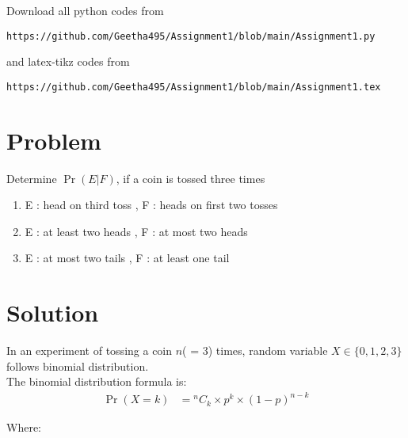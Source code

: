 \documentclass[journal,12pt,twocolumn]{IEEEtran}
\newcommand*{\Comb}[2]{{}^{#1}C_{#2}}%
\begin{document}
Download all python codes from 
\begin{lstlisting}
https://github.com/Geetha495/Assignment1/blob/main/Assignment1.py
\end{lstlisting}
%
and latex-tikz codes from 
%
\begin{lstlisting}
https://github.com/Geetha495/Assignment1/blob/main/Assignment1.tex 
\end{lstlisting}



\section{Problem}
Determine $\Pr( E|F)$, if a coin is tossed three
times
\begin{enumerate}[label=\roman*]
    \item E : head on third toss , F : heads on first
two tosses
\item E : at least two heads , F : at most two
heads
\item E : at most two tails , F : at least one tail
\end{enumerate}



\section{Solution}
In an experiment of tossing a coin $n$( = 3) times, random variable  $X \in \lbrace 0,1,2,3 \rbrace$ follows binomial distribution.\\
The binomial distribution formula is:
\begin{align*}
 \Pr( X=k ) &= \Comb{n}{k} \times p^k \times (1- p)^{n - k}
\end{align*}

Where:


\begin{table}[h]

    \centering
\caption{The binomial distribution formula}
    \label{table:0}
\end{table}
\end{document}
